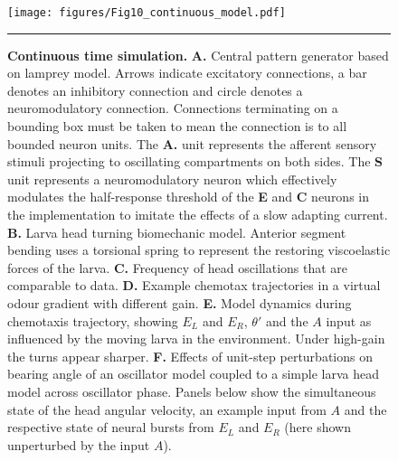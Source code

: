 \documentclass[10pt,a4paper]{article}
\begin{document}
\begin{figure}[!ht]
\begin{center}
\texttt{[image: figures/Fig10\_continuous\_model.pdf]}
\caption{{\bf Continuous time simulation.} {\bf A.} Central pattern generator based on lamprey model. Arrows indicate excitatory connections, a bar denotes an inhibitory connection and circle denotes a neuromodulatory connection. Connections terminating on a bounding box must be taken to mean the connection is to all bounded neuron units. The {\bf A.} unit represents the afferent sensory stimuli projecting to oscillating compartments on both sides. The {\bf S} unit represents a neuromodulatory neuron which effectively modulates the half-response threshold of the {\bf E} and {\bf C} neurons in the \cite{wilson1999spikes} implementation to imitate the effects of a slow adapting current.
{\bf B.} Larva head turning biomechanic model. Anterior segment bending uses a torsional spring to represent the restoring viscoelastic forces of the larva.
{\bf C.} Frequency of head oscillations that are comparable to data.
{\bf D.} Example chemotax trajectories in a virtual odour gradient with different gain.
{\bf E.} Model dynamics during chemotaxis trajectory, showing $E_L$ and  $E_R$, $\theta'$ and the $A$ input as influenced by the moving larva in the environment. Under high-gain the turns appear sharper.
{\bf F.} Effects of unit-step perturbations on bearing angle of an oscillator model coupled to a simple larva head model across oscillator phase. Panels below show the simultaneous state of the head angular velocity, an example input from $A$ and the respective state of neural bursts from $E_L$ and $E_R$ (here shown unperturbed by the input $A$).
\label{fig:LampreyModel}}
\hrule
\end{center}
\end{figure}
\end{document}
